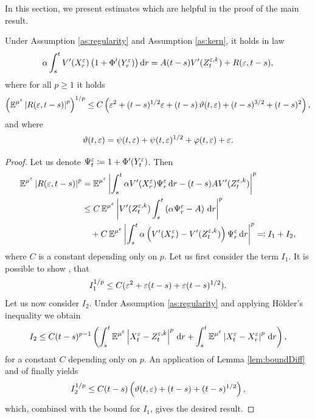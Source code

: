 \documentclass[10pt]{article}
\begin{document}
In this section, we present estimates which are helpful in the proof of the main result.
\begin{lemma}\label{lem:ContBound} Under Assumption \ref{as:regularity} and Assumption \ref{as:kern}, it holds in law 
	\begin{equation}
	\alpha \int_s^t V'(X^\varepsilon_r)\, \big(1 + \Phi'(Y^\varepsilon_r)\big)\,\mathrm{d} r = A (t - s)V'(Z_t^{\varepsilon, k}) + R(\varepsilon, t-s),
	\end{equation}
	where for all $p \geq 1$ it holds
	\begin{equation}
	\left( \operatorname{\mathbb{E}}^{\mu^\varepsilon} \left\lvert R(\varepsilon, t-s)\right\rvert^p \right)^{1/p} \leq C\left(\varepsilon^2 + (t-s)^{1/2}\varepsilon + (t-s)\,\vartheta(t, \varepsilon) + (t-s)^{3/2} + (t-s)^2 \right),
	\end{equation}
	and where 
	\begin{equation}
	\vartheta(t, \varepsilon) = \psi(t, \varepsilon) + \psi(t, \varepsilon)^{1/2} + \varphi(t, \varepsilon) + \varepsilon.
	\end{equation}
\end{lemma}
\begin{proof} Let us denote $\Psi_t^\varepsilon \coloneqq 1 + \Phi'(Y^\varepsilon_t)$. Then
	\begin{equation}
	\begin{aligned}
	\operatorname{\mathbb{E}}^{\mu^\varepsilon} \left\lvert R(\varepsilon, t-s)\right\rvert^p &= \operatorname{\mathbb{E}}^{\mu^\varepsilon} \left\lvert\int_s^t \alpha V'(X_r^\varepsilon)\Psi_r^\varepsilon \,\mathrm{d} r - (t-s) A V'(Z_t^{\varepsilon,k})\right\rvert^p \\
	&\leq C \operatorname{\mathbb{E}}^{\mu^\varepsilon}\left| V'(Z_t^{\varepsilon,k}) \int_s^t \left(\alpha \Psi_r^\varepsilon - A\right) \,\mathrm{d} r \right|^p \\
	&\quad +C \operatorname{\mathbb{E}}^{\mu^\varepsilon} \left| \int_s^t \alpha \left(V'(X_r^\varepsilon ) - V'(Z_t^{\varepsilon,k})\right) \Psi_r^\varepsilon \,\mathrm{d} r \right|^p \eqqcolon I_1 + I_2,
	\end{aligned}
	\end{equation}	
	where $C$ is a constant depending only on $p$.
	Let us first consider the term $I_1$. It is possible to show \cite[Lemma 5.6]{PaS07}, that 
	\begin{equation}
	I_1^{1/p} \leq C(\varepsilon^2 + \varepsilon(t-s) + \varepsilon(t-s)^{1/2}).
	\end{equation}
	Let us now consider $I_2$. Under Assumption \ref{as:regularity} and applying Hölder's inequality we obtain
	\begin{equation}
	I_2 \leq C (t-s)^{p-1} \left(\int_s^t \operatorname{\mathbb{E}}^{\mu^\varepsilon} \left\lvert X_t^\varepsilon - Z_t^{\varepsilon,k}\right\rvert^p \,\mathrm{d} r + \int_s^t \operatorname{\mathbb{E}}^{\mu^\varepsilon} \left\lvert X_t^\varepsilon - X_r^{\varepsilon}\right\rvert^p \,\mathrm{d} r\right),
	\end{equation}
	for a constant $C$ depending only on $p$. An application of Lemma \ref{lem:boundDiff} and of \cite[Lemma 6.1]{PaS07} finally yields
	\begin{equation}
	I_2^{1/p} \leq C (t-s) \left(\vartheta(t, \varepsilon) + (t-s) + (t-s)^{1/2}\right),
	\end{equation}
	which, combined with the bound for $I_1$, gives the desired result.
\end{proof}
\end{document}
